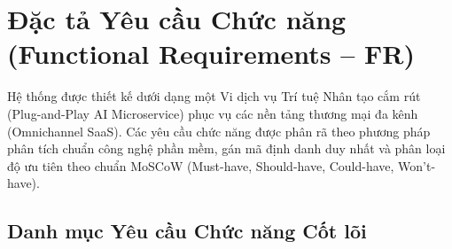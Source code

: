 \section{Đặc tả Yêu cầu Chức năng (Functional Requirements -- FR)}
\label{sec:yeu_cau_chuc_nang}

Hệ thống được thiết kế dưới dạng một Vi dịch vụ Trí tuệ Nhân tạo cắm rút (Plug-and-Play AI Microservice) phục vụ các nền tảng thương mại đa kênh (Omnichannel SaaS). Các yêu cầu chức năng được phân rã theo phương pháp phân tích chuẩn công nghệ phần mềm, gán mã định danh duy nhất và phân loại độ ưu tiên theo chuẩn MoSCoW (Must-have, Should-have, Could-have, Won't-have).

\subsection{Danh mục Yêu cầu Chức năng Cốt lõi}
\label{subsec:fr_list}

